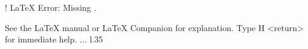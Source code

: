 \relax 
! LaTeX Error: Missing .

See the LaTeX manual or LaTeX Companion for explanation.
Type  H <return>  for immediate help. ...                                                                                                l.35                    \providecommand\hyper@newdestlabel[2]{}
